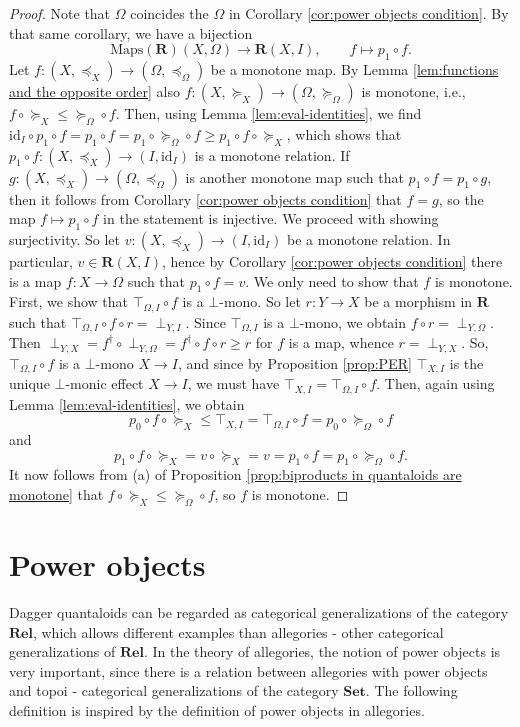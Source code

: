 \documentclass[12pt]{tac}
\theoremstyle{definition}
\theoremstyle{remark}
\newcommand{\qo}{{\boldsymbol{\preccurlyeq}}}
\newcommand{\qop}{{\boldsymbol{\succcurlyeq}}}
\newcommand{\<}{\langle}
\renewcommand{\>}{\rangle}
\renewcommand{\:}{\colon}
\newcommand{\id}{\mathrm{id}}
\begin{document}
\begin{proof}
    Note that $\Omega$ coincides the $\Omega$ in Corollary \ref{cor:power objects condition}. By that same corollary, we have a bijection
    \[\mathrm{Maps}(\mathbf R)(X,\Omega)\to\mathbf R(X,I),\qquad f\mapsto p_1\circ f.\]
Let $f:(X,\qo_X)\to(\Omega,\qo_\Omega)$ be a monotone map. By Lemma \ref{lem:functions and the opposite order} also $f:(X,\qop_X)\to(\Omega,\qop_\Omega)$ is monotone, i.e., $f\circ \qop_X\leq \qop_\Omega\circ f$. 
Then, using Lemma \ref{lem:eval-identities}, we find $\id_I\circ p_1\circ f=p_1\circ f =p_1\circ\qop_\Omega\circ f\geq p_1\circ f\circ \qop_X$, which shows that $p_1\circ f:(X,\qo_X)\to (I,\id_I)$ is a monotone relation. If $g:(X,\qo_X)\to(\Omega,\qo_\Omega)$ is another monotone map such that $p_1\circ f=p_1\circ g$, then it follows from Corollary \ref{cor:power objects condition} that $f=g$, so the map $f\mapsto p_1\circ f$ in the statement is injective. 
We proceed with showing surjectivity. So let $v:(X,\qo_X)\to(I,\id_I)$ be a monotone relation. In particular, $v\in\mathbf R(X,I)$, hence by Corollary \ref{cor:power objects condition} there is a map $f:X\to\Omega$ such that $p_1\circ f=v$. We only need to show that $f$ is monotone. First, we show that $\top_{\Omega,I}\circ f$ is a $\bot$-mono. So let $r:Y\to X$ be a morphism in $\mathbf R$ such that $\top_{\Omega,I}\circ f\circ r=\perp_{Y,I}$. Since $\top_{\Omega,I}$ is a $\bot$-mono, we obtain $f\circ r=\perp_{Y,\Omega}$.
Then $\perp_{Y,X}=f^\dag\circ \perp_{Y,\Omega}=f^\dag\circ f\circ r\geq r$ for $f$ is a map, whence  $r=\perp_{Y,X}$. So, $\top_{\Omega,I}\circ f$ is a $\bot$-mono $X\to I$, and since by Proposition \ref{prop:PER} $\top_{X,I}$ is the unique $\bot$-monic effect $X\to I$, we must have $\top_{X,I}=\top_{\Omega,I}\circ f$.
Then, again using Lemma \ref{lem:eval-identities}, we obtain
\[ p_0\circ f\circ\qop_X \leq \top_{X,I}=\top_{\Omega,I}\circ f=p_0\circ\qop_\Omega\circ f\]
and
\[ p_1\circ f\circ \qop_X =v\circ \qop_X=v=p_1\circ f=p_1\circ \qop_\Omega\circ f.\] It now follows from (a) of Proposition \ref{prop:biproducts in quantaloids are monotone} that $f\circ\qop_X\leq \qop_\Omega\circ f$, so $f$ is monotone. 
\end{proof}



\section{Power objects}\label{sec:power objects}

Dagger quantaloids can be regarded as categorical generalizations of the category $\mathbf{Rel}$, which allows different examples than allegories - other categorical generalizations of $\mathbf{Rel}$. In the theory of allegories, the notion of power objects is very important, since there is a relation between allegories with power objects and topoi - categorical generalizations of the category $\mathbf{Set}$. The following definition is inspired by the definition of power objects in allegories.
\end{document}
